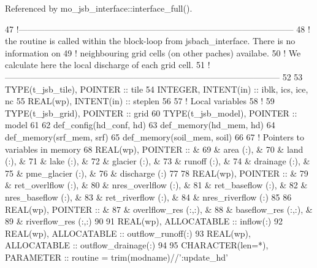 Referenced by mo\+\_\+jsb\+\_\+interface\+::interface\+\_\+full().


\begin{DoxyCode}
47   \textcolor{comment}{!------------------------------------------------------------------------------------------------}
48   \textcolor{comment}{! the routine is called within the block-loop from jsbach\_interface. There is no information on }
49   \textcolor{comment}{! neighbouring grid cells (on other paches) availabe.}
50   \textcolor{comment}{! We calculate here the local discharge of each grid cell.}
51   \textcolor{comment}{!------------------------------------------------------------------------------------------------}
52 
53     \textcolor{keywordtype}{TYPE}(t\_jsb\_tile),  \textcolor{keywordtype}{POINTER}    :: tile
54     \textcolor{keywordtype}{INTEGER},           \textcolor{keywordtype}{INTENT(in)} :: iblk, ics, ice, nc
55     \textcolor{keywordtype}{REAL(wp)},          \textcolor{keywordtype}{INTENT(in)} :: steplen
56 
57     \textcolor{comment}{! Local variables}
58     \textcolor{comment}{!}
59     \textcolor{keywordtype}{TYPE}(t\_jsb\_grid),  \textcolor{keywordtype}{POINTER} :: grid
60     \textcolor{keywordtype}{TYPE}(t\_jsb\_model), \textcolor{keywordtype}{POINTER} :: model
61 
62     def\_config(hd\_conf, hd)
63     def\_memory(hd\_mem, hd)
64     def\_memory(srf\_mem, srf)
65     def\_memory(soil\_mem, soil)
66 
67     \textcolor{comment}{! Pointers to variables in memory}
68     \textcolor{keywordtype}{REAL(wp)}, \textcolor{keywordtype}{POINTER} :: &
69       & area        (:), &
70       & land        (:), &
71       & lake        (:), &
72       & glacier     (:), &
73       & runoff      (:), &
74       & drainage    (:), &
75       & pme\_glacier (:), &
76       & discharge   (:)
77 
78     \textcolor{keywordtype}{REAL(wp)}, \textcolor{keywordtype}{POINTER} ::    &
79       & ret\_overlflow  (:), &
80       & nres\_overlflow (:), &
81       & ret\_baseflow   (:), &
82       & nres\_baseflow  (:), &
83       & ret\_riverflow  (:), &
84       & nres\_riverflow (:)
85 
86     \textcolor{keywordtype}{REAL(wp)}, \textcolor{keywordtype}{POINTER} ::     &
87       & overlflow\_res (:,:), &
88       & baseflow\_res  (:,:), &
89       & riverflow\_res (:,:)
90 
91     \textcolor{keywordtype}{REAL(wp)}, \textcolor{keywordtype}{ALLOCATABLE} :: inflow(:)
92     \textcolor{keywordtype}{REAL(wp)}, \textcolor{keywordtype}{ALLOCATABLE} :: outflow\_runoff(:)
93     \textcolor{keywordtype}{REAL(wp)}, \textcolor{keywordtype}{ALLOCATABLE} :: outflow\_drainage(:)
94 
95     \textcolor{keywordtype}{CHARACTER(len=*)}, \textcolor{keywordtype}{PARAMETER} :: routine = trim(modname)//\textcolor{stringliteral}{':update\_hd'}

\end{DoxyCode}
